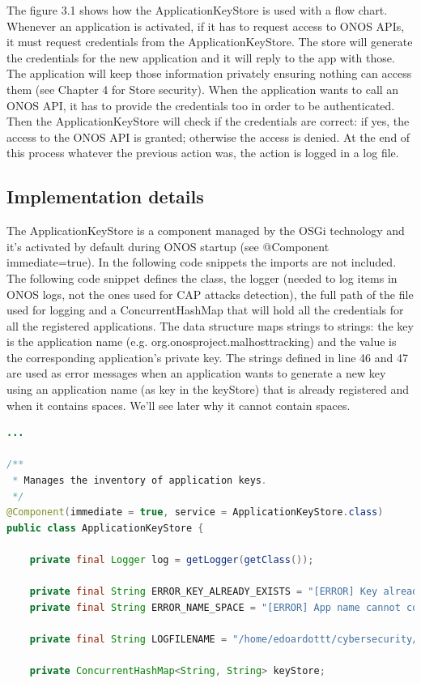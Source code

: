 The figure 3.1 shows how the ApplicationKeyStore is used with a flow chart. Whenever an application is activated, if it has to request access to ONOS APIs, it must request credentials from the ApplicationKeyStore. The store will generate the credentials for the new application and it will reply to the app with those. The application will keep those information privately ensuring nothing can access them (see Chapter 4 for Store security). When the application wants to call an ONOS API, it has to provide the credentials too in order to be authenticated. Then the ApplicationKeyStore will check if the credentials are correct: if yes, the access to the ONOS API is granted; otherwise the access is denied. At the end of this process whatever the previous action was, the action is logged in a log file.


\subsection{Implementation details}

The ApplicationKeyStore is a component managed by the OSGi technology and it's activated by default during ONOS startup (see @Component immediate=true). In the following code snippets the imports are not included. The following code snippet defines the class, the logger (needed to log items in ONOS logs, not the ones used for CAP attacks detection), the full path of the file used for logging and a ConcurrentHashMap that will hold all the credentials for all the registered applications. The data structure maps strings to strings: the key is the application name (e.g. org.onosproject.malhosttracking) and the value is the corresponding application's private key. The strings defined in line 46 and 47 are used as error messages when an application wants to generate a new key using an application name (as key in the keyStore) that is already registered and when it contains spaces. We'll see later why it cannot contain spaces.
\begin{lstlisting}[language=java,firstnumber=36]
...

/**
 * Manages the inventory of application keys.
 */
@Component(immediate = true, service = ApplicationKeyStore.class)
public class ApplicationKeyStore {

    private final Logger log = getLogger(getClass());

    private final String ERROR_KEY_ALREADY_EXISTS = "[ERROR] Key already exists";
    private final String ERROR_NAME_SPACE = "[ERROR] App name cannot contain spaces";

    private final String LOGFILENAME = "/home/edoardottt/cybersecurity/thesis/onos-cap/onos.log";

    private ConcurrentHashMap<String, String> keyStore;
\end{lstlisting}

